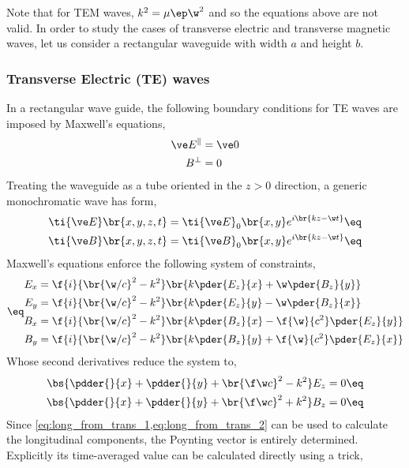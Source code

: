 \documentclass{article}
\begin{document}
Note that for TEM waves, $k^2 = \mu \ep \w^2$ and so the equations above are not valid. In order to study the cases of transverse electric and transverse magnetic waves, let us consider a rectangular waveguide with width $a$ and height $b$.

\subsubsection{Transverse Electric (TE) waves}
In a rectangular wave guide, the following boundary conditions for TE waves are imposed by Maxwell's equations,
\begin{align*}
    \ve E^{\parallel} &= \ve 0 \\
    B^{\perp} &= 0
\end{align*}
Treating the waveguide as a tube oriented in the $z > 0$ direction, a generic monochromatic wave has form,
\begin{align*}
    \ti{\ve E}\br{x, y, z, t} &= \ti{\ve E}_0 \br{x, y} e^{i\br{k z - \w t}} \eq \label{eq:TM}\\
    \ti{\ve B}\br{x, y, z, t} &= \ti{\ve B}_0 \br{x, y} e^{i\br{k z - \w t}} \eq \label{eq:TE}
\end{align*}
Maxwell's equations enforce the following system of constraints,
\begin{align*}
\eq \label{eq:main_waveguide_eqn}
\begin{split}
    E_x &= \f{i}{\br{\w / c}^2 - k^2} \br{k \pder{E_z}{x} + \w \pder{B_z}{y}} \\
    E_y &= \f{i}{\br{\w / c}^2 - k^2} \br{k \pder{E_z}{y} - \w \pder{B_z}{x}} \\
    B_x &= \f{i}{\br{\w / c}^2 - k^2} \br{k \pder{B_z}{x} - \f{\w}{c^2} \pder{E_z}{y}} \\
    B_y &= \f{i}{\br{\w / c}^2 - k^2} \br{k \pder{B_z}{y} + \f{\w}{c^2} \pder{E_z}{x}}
\end{split}
\end{align*}
Whose second derivatives reduce the system to,
\begin{align*}
    \bs{\pdder{}{x} + \pdder{}{y} + \br{\f \w c}^2 - k^2} E_z &= 0 \eq \label{eq:Ez}\\
    \bs{\pdder{}{x} + \pdder{}{y} + \br{\f \w c}^2 + k^2} B_z &= 0 \eq \label{eq:Bz}
\end{align*}
Since \cref{eq:long_from_trans_1,eq:long_from_trans_2} can be used to calculate the longitudinal components, the Poynting vector is entirely determined. Explicitly its time-averaged value can be calculated directly using a trick,
\end{document}
